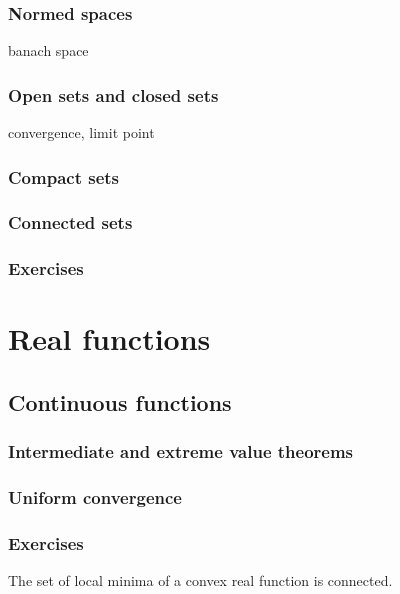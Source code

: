 \documentclass{../note}
\begin{document}
\section{Normed spaces}
banach space

\section{Open sets and closed sets}
convergence, limit point
\section{Compact sets}
\section{Connected sets}



\section*{Exercises}








\part{Real functions}

\chapter{Continuous functions}
\section{Intermediate and extreme value theorems}
\section{Uniform convergence}
\section{}

\section*{Exercises}

\begin{prb}
The set of local minima of a convex real function is connected.
\end{prb}
\end{document}
